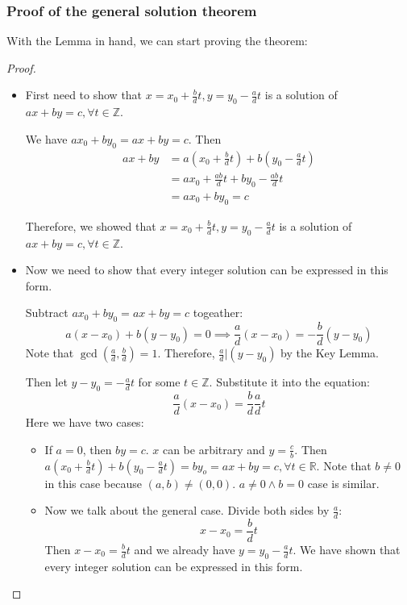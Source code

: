 \documentclass[letterpaper,12pt,oneside]{article}
\begin{document}
\subsubsection{Proof of the general solution theorem}
With the Lemma in hand, we can start proving the theorem:\begin{proof}
    \begin{itemize}
        \item First need to show that $x=x_0+\frac{b}{d}t, y=y_0-\frac{a}{d}t$ is a solution
              of $ax+by=c, \forall t \in \mathbb{Z}$.

              We have $ax_0+by_0=ax+by=c$. Then \begin{align*}
                  ax+by & = a(x_0+\frac{b}{d}t) + b(y_0-\frac{a}{d}t)   \\
                        & = ax_0 + \frac{ab}{d}t + by_0 - \frac{ab}{d}t \\
                        & = ax_0 + by_0 = c
              \end{align*}

              Therefore, we showed that $x=x_0+\frac{b}{d}t, y=y_0-\frac{a}{d}t$ is a
              solution of $ax+by=c, \forall t \in \mathbb{Z}$.
        \item Now we need to show that every integer solution can be expressed in this form.

              Subtract $ax_0+by_0=ax+by=c$ togeather: \[
                  a(x-x_0) + b(y-y_0) = 0 \implies \frac{a}{d}(x-x_0) = - \frac{b}{d}(y-y_0)
              \]
              Note that $\gcd(\frac{a}{d}, \frac{b}{d}) = 1$. Therefore, $\frac{a}{d} |
                  (y-y_0)$ by the Key Lemma.

              Then let $y-y_0 = -\frac{a}{d}t$ for some $t \in \mathbb{Z}$. Substitute it
              into the equation: \[
                  \frac{a}{d}(x-x_0) = \frac{b}{d}\frac{a}{d}t
              \]
              Here we have two cases:\begin{itemize}
                  \item If $a=0$, then $by=c$. $x$ can be arbitrary and $y = \frac{c}{b}$. Then
                        $a(x_0+\frac{b}{d}t) + b(y_0-\frac{a}{d}t) = by_o = ax+by = c,\forall
                            t\in\mathbb{R}$. Note that $b\neq 0$ in this case because $(a,b)\neq(0,0)$.
                        $a\neq 0 \land b=0$ case is similar.
                  \item Now we talk about the general case. Divide both sides by $\frac{a}{d}$: \[
                            x-x_0 = \frac{b}{d}t
                        \]
                        Then $x - x_0 = \frac{b}{d}t$ and we already have $y = y_0 - \frac{a}{d}t$. We
                        have shown that every integer solution can be expressed in this form.
              \end{itemize}
    \end{itemize}
\end{proof}
\end{document}
